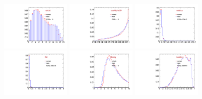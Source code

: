 \begin{figure}
  \centering
  \includegraphics[width=0.3\textwidth]{Figures/VariablesComparison/Data_endcaps_figs/closetrk}
  \includegraphics[width=0.3\textwidth]{Figures/VariablesComparison/Data_endcaps_figs/cosa}
  \includegraphics[width=0.3\textwidth]{Figures/VariablesComparison/Data_endcaps_figs/docatrk}
  \includegraphics[width=0.3\textwidth]{Figures/VariablesComparison/Data_endcaps_figs/fl3d}
  \includegraphics[width=0.3\textwidth]{Figures/VariablesComparison/Data_endcaps_figs/fls3d}
  \includegraphics[width=0.3\textwidth]{Figures/VariablesComparison/Data_endcaps_figs/iso}

\end{figure}
